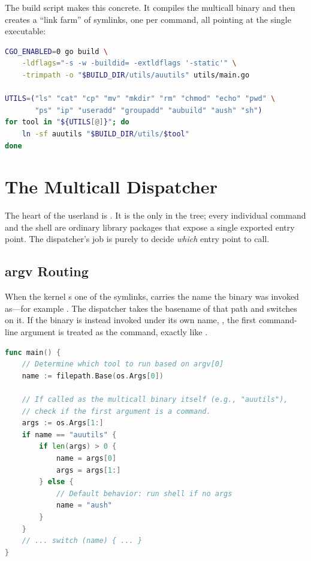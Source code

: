 The build script makes this concrete. It compiles the multicall binary and then
creates a ``link farm'' of symlinks, one per command, all pointing at the single
executable:

\begin{lstlisting}[language=bash, caption={The multicall build and symlink farm (scripts/build.sh)}]
CGO_ENABLED=0 go build \
    -ldflags="-s -w -buildid= -extldflags '-static'" \
    -trimpath -o "$BUILD_DIR/utils/auutils" utils/main.go

UTILS=("ls" "cat" "cp" "mv" "mkdir" "rm" "chmod" "echo" "pwd" \
       "ps" "ip" "useradd" "groupadd" "aubuild" "aush" "sh")
for tool in "${UTILS[@]}"; do
    ln -sf auutils "$BUILD_DIR/utils/$tool"
done
\end{lstlisting}

\section{The Multicall Dispatcher}

The heart of the userland is . It is the only
\code{package main} in the tree; every individual command and the shell are
ordinary library packages that expose a single exported entry point. The
dispatcher's job is purely to decide \emph{which} entry point to call.

\subsection{argv Routing}

When the kernel s one of the symlinks,  carries the
name the binary was invoked as---for example . The dispatcher
takes the basename of that path and switches on it. If the binary is instead
invoked under its own name, \code{auutils}, the first command-line argument is
treated as the command, exactly like \code{busybox ls -l}.

\begin{lstlisting}[language=Go, caption={argv-based command resolution (utils/main.go)}]
func main() {
    // Determine which tool to run based on argv[0]
    name := filepath.Base(os.Args[0])

    // If called as the multicall binary itself (e.g., "auutils"),
    // check if the first argument is a command.
    args := os.Args[1:]
    if name == "auutils" {
        if len(args) > 0 {
            name = args[0]
            args = args[1:]
        } else {
            // Default behavior: run shell if no args
            name = "aush"
        }
    }
    // ... switch (name) { ... }
}
\end{lstlisting}

